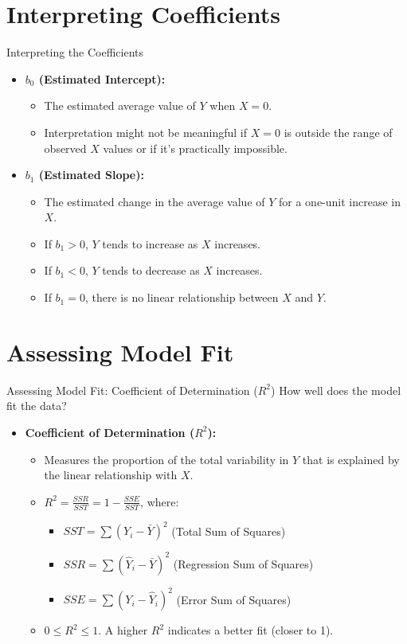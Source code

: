 \documentclass[aspectratio=169]{beamer}
\begin{document}
\section{Interpreting Coefficients}
\begin{frame}{Interpreting the Coefficients}
  \begin{itemize}
    \item \textbf{$b_0$ (Estimated Intercept):}
    \begin{itemize}
        \item The estimated average value of $Y$ when $X=0$.
        \item Interpretation might not be meaningful if $X=0$ is outside the range of observed $X$ values or if it's practically impossible.
    \end{itemize}
    \vspace{1em}
    \item \textbf{$b_1$ (Estimated Slope):}
    \begin{itemize}
        \item The estimated change in the average value of $Y$ for a one-unit increase in $X$.
        \item If $b_1 > 0$, $Y$ tends to increase as $X$ increases.
        \item If $b_1 < 0$, $Y$ tends to decrease as $X$ increases.
        \item If $b_1 = 0$, there is no linear relationship between $X$ and $Y$.
    \end{itemize}
  \end{itemize}
\end{frame}

\section{Assessing Model Fit}
\begin{frame}{Assessing Model Fit: Coefficient of Determination ($R^2$)}
  How well does the model fit the data?
  \begin{itemize}
    \item \textbf{Coefficient of Determination ($R^2$):}
    \begin{itemize}
        \item Measures the proportion of the total variability in $Y$ that is explained by the linear relationship with $X$.
        \item $R^2 = \frac{SSR}{SST} = 1 - \frac{SSE}{SST}$, where:
            \begin{itemize}
                \item $SST = \sum (Y_i - \bar{Y})^2$ (Total Sum of Squares)
                \item $SSR = \sum (\hat{Y}_i - \bar{Y})^2$ (Regression Sum of Squares)
                \item $SSE = \sum (Y_i - \hat{Y}_i)^2$ (Error Sum of Squares)
            \end{itemize}
        \item $0 \le R^2 \le 1$. A higher $R^2$ indicates a better fit (closer to 1).
    \end{itemize}
  \end{itemize}
\end{frame}
\end{document}
